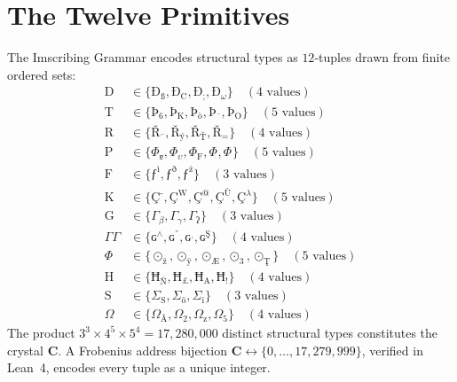 \documentclass[12pt,twoside]{book}
\theoremstyle{definition}
\newcommand{\crystal}{\mathbf{C}}
\newcommand{\prim}[1]{\text{#1}}
\begin{document}
\section{The Twelve Primitives}

The Imscribing Grammar encodes structural types as $12$-tuples drawn from finite ordered sets:
\begin{align}
\prim{D} &\in \{ \text{Ð}_{\text{ß}}, \text{Ð}_{\text{C}}, \text{Ð}_{\text{;}}, \text{Ð}_{\omega} \} \quad (\text{4 values}) \nonumber\\
\prim{T} &\in \{ \text{Þ}_{\text{6}}, \text{Þ}_{\text{K}}, \text{Þ}_{\text{ò}}, \text{Þ}_{\text{¨}}, \text{Þ}_{\text{O}} \} \quad (\text{5 values}) \nonumber\\
\prim{R} &\in \{ \text{Ř}_{\text{¯}}, \text{Ř}_{\text{ý}}, \text{Ř}_{\text{Ť}}, \text{Ř}_{\text{=}} \} \quad (\text{4 values}) \nonumber\\
\prim{P} &\in \{ \Phi_{\text{ɐ}}, \Phi_{\upsilon}, \Phi_{\text{F}}, \Phi_{\dot{}}, \Phi_{\text{}} \} \quad (\text{5 values}) \nonumber\\
\prim{F} &\in \{ \text{ƒ}^{\text{ì}}, \text{ƒ}^{\text{ð}}, \text{ƒ}^{\text{ż}} \} \quad (\text{3 values}) \nonumber\\
\prim{K} &\in \{ \text{Ç}^{\text{-}}, \text{Ç}^{\text{W}}, \text{Ç}^{\text{@}}, \text{Ç}^{\text{Ù}}, \text{Ç}^{\lambda} \} \quad (\text{5 values}) \nonumber\\
\prim{G} &\in \{ \Gamma_{\beta}, \Gamma_{\gamma}, \Gamma_{\text{ʔ}} \} \quad (\text{3 values}) \nonumber\\
\Gamma \!\!\! \Gamma &\in \{ \text{ɢ}^{\land}, \text{ɢ}^{\text{˝}}, \text{ɢ}^{\text{ˌ}}, \text{ɢ}^{\text{Ş}} \} \quad (\text{4 values}) \nonumber\\
\Phi &\in \{ \odot_{\text{ž}}, \odot_{\text{ÿ}}, \odot_{\text{Æ}}, \odot_{\text{3}}, \odot_{\text{Ţ}} \} \quad (\text{5 values}) \nonumber\\
\prim{H} &\in \{ \text{Ħ}_{\text{Ñ}}, \text{Ħ}_{\text{£}}, \text{Ħ}_{\text{A}}, \text{Ħ}_{\text{!}} \} \quad (\text{4 values}) \nonumber\\
\prim{S} &\in \{ \Sigma_{\text{S}}, \Sigma_{\text{ő}}, \Sigma_{\text{ï}} \} \quad (\text{3 values}) \nonumber\\
\Omega &\in \{ \Omega_{\text{Å}}, \Omega_{\text{2}}, \Omega_{\text{z}}, \Omega_{\text{5}} \} \quad (\text{4 values}) \nonumber
\end{align}
The product $3^3 \times 4^5 \times 5^4 = 17,280,000$ distinct structural types constitutes the crystal $\crystal$. A Frobenius address bijection $\crystal \leftrightarrow \{0, \ldots, 17,279,999\}$, verified in Lean~4, encodes every tuple as a unique integer.
\end{document}
